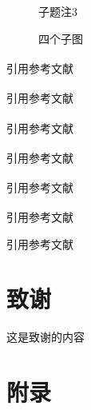 \documentclass[12pt]{article}
\newcommand{\upcite}[1]{\textsuperscript{\cite{#1}}}
\numberwithin{equation}{section}
\begin{document}
\begin{figure}[!htp]
{\begin{subfloatrow}[2]
{        }{\caption{子题注3}\label{trifig:c}}
        \end{subfloatrow}
    }{\caption{四个子图}\label{trifig}}
\end{figure}
\newpage
引用参考文献
\upcite{RN1}


引用参考文献
\upcite{RN2}


引用参考文献
\upcite{RN3}

引用参考文献
\upcite{RN4}

引用参考文献
\upcite{RN5}

引用参考文献
\upcite{RN6}

引用参考文献
\cite{RN7}
\newpage
\section{致谢}
这是致谢的内容
\newpage



\newpage


  \section*{附录}
  
\end{document}
